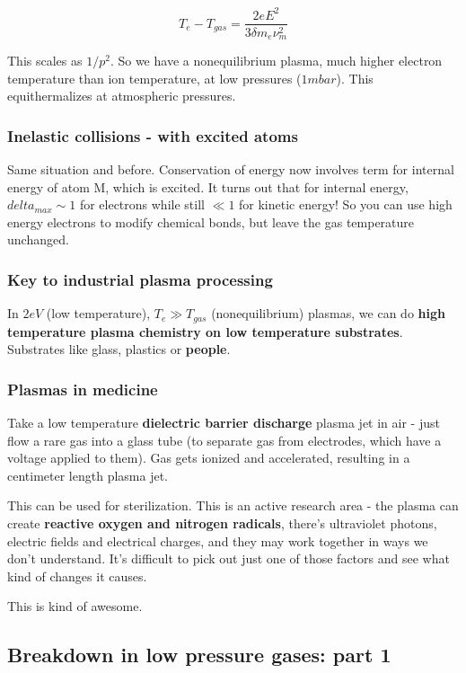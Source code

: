 \documentclass[PlasmaNotes.tex]{subfiles}
\begin{document}
\[T_e - T_{gas} = \frac{2 e E^2}{3 \delta m_e \nu_m^2}\]

This scales as $1/p^2$. So we have a nonequilibrium plasma, much higher electron temperature than ion temperature, at low pressures ($1 mbar$). This equithermalizes at atmospheric pressures.

\subsubsection{Inelastic collisions - with excited atoms}

Same situation and before. Conservation of energy now involves term for internal energy of atom M, which is excited. It turns out that for internal energy, $delta_{max} \sim 1$ for electrons while still $\ll 1$ for kinetic energy! So you can use high energy electrons to modify chemical bonds, but leave the gas temperature unchanged.

\subsubsection{Key to industrial plasma  processing}

In $2 eV$ (low temperature), $T_e \gg T_{gas}$ (nonequilibrium) plasmas, we can do \textbf{high temperature plasma chemistry on low temperature substrates}. Substrates like glass, plastics or \textbf{people}.

\subsubsection{Plasmas in medicine}

Take a low temperature \textbf{dielectric barrier discharge} plasma jet in air - just flow a rare gas into a glass tube (to separate gas from electrodes, which have a voltage applied to them). Gas gets ionized and accelerated, resulting in a centimeter length plasma jet.

This can be used for sterilization. This is an active research area - the plasma can create \textbf{reactive oxygen and nitrogen radicals}, there's ultraviolet photons, electric fields and electrical charges, and they may work together in ways we don't understand. It's difficult to pick out just one of those factors and see what kind of changes it causes.

This is kind of awesome.

\subsection{Breakdown in low pressure gases: part 1}
\end{document}
